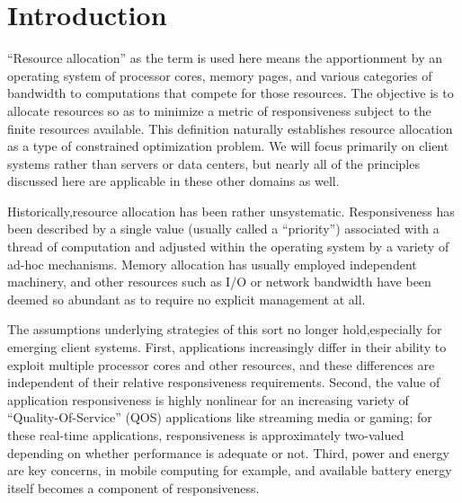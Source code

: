 \section{Introduction}

``Resource allocation'' as the term is used here means the apportionment by an operating system of processor cores, memory pages, and various categories of  bandwidth to computations that compete for those resources.  The objective is to allocate resources so as to minimize a metric of responsiveness subject to the finite resources available.  This definition naturally establishes resource allocation as a type of constrained optimization problem.  We will focus primarily on client systems rather than servers or data centers, but nearly all of the principles discussed here are applicable in these other domains as well.

Historically,resource allocation has been rather unsystematic.  Responsiveness has been described by a single value (usually called a “priority”) associated with a thread of computation and adjusted within the operating system by a variety of ad-hoc mechanisms.  Memory allocation has usually employed independent machinery, and other resources such as I/O or network bandwidth have been deemed so abundant as to require no explicit management at all.

The assumptions underlying strategies of this sort no longer hold,especially for emerging client systems.  First, applications increasingly differ in their ability to exploit multiple processor cores and other resources, and these differences are independent of their relative responsiveness requirements.  Second, the value of application responsiveness is highly nonlinear for an increasing variety of “Quality-Of-Service” (QOS) applications like streaming media or gaming; for these real-time applications, responsiveness is approximately two-valued depending on whether performance is adequate or not.  Third, power and energy are key concerns, in mobile computing for example, and available battery energy itself becomes a component of responsiveness.
